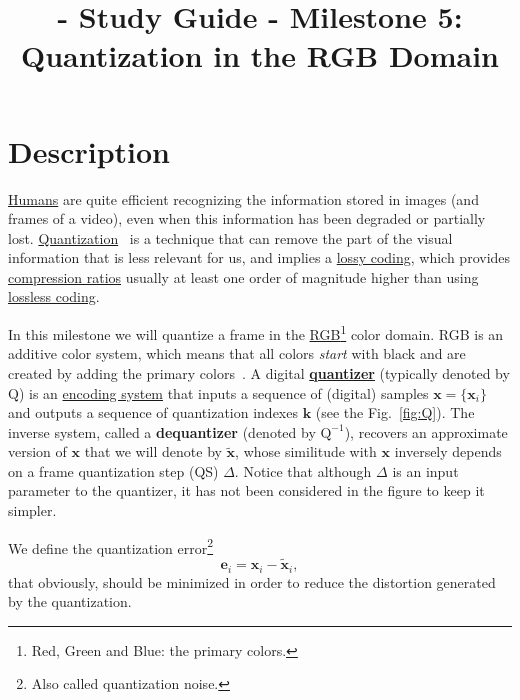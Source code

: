 
\title{\SM{} - Study Guide - Milestone 5: Quantization in the RGB Domain}

\maketitle

\tableofcontents

\section{Description}
\href{https://en.wikipedia.org/wiki/Visual_system}{Humans} are quite
efficient recognizing the information stored in images (and frames of
a video), even when this information has been degraded or partially
lost. \href{https://en.wikipedia.org/wiki/Quantization_(signal_processing)}{Quantization}~\cite{sayood2017introduction,vetterli2014foundations}
is a technique that can remove the part of the visual information that
is less relevant for us, and implies a
\href{https://en.wikipedia.org/wiki/Lossy_compression}{lossy coding},
which provides
\href{https://en.wikipedia.org/wiki/Data_compression_ratio}{compression
  ratios} usually at least one order of magnitude higher than using
\href{https://en.wikipedia.org/wiki/Lossless_compression}{lossless
  coding}.

In this milestone we will quantize a frame in the
\href{https://en.wikipedia.org/wiki/RGB_color_model}{RGB\footnote{Red,
    Green and Blue: the primary colors.} color domain}. RGB is an
additive color system, which means that all colors \emph{start} with
black and are created by adding the primary
colors~\cite{burger2016digital}. A digital
\href{https://en.wikipedia.org/wiki/Quantization_(signal_processing)}{\textbf{quantizer}}
(typically denoted by $\text{Q}$) is an
\href{https://en.wikipedia.org/wiki/Data_compression}{encoding system}
that inputs a sequence of (digital) samples
${\mathbf x}=\{{\mathbf x}_i\}$ and outputs a sequence of quantization
indexes ${\mathbf k}$ (see the Fig.~\ref{fig:Q}). The inverse system,
called a \textbf{dequantizer} (denoted by $\text{Q}^{-1}$), recovers
an approximate version of ${\mathbf x}$ that we will denote by
$\tilde{{\mathbf x}}$, whose similitude with ${\mathbf x}$ inversely
depends on a frame quantization step (QS) $\Delta$. Notice that
although $\Delta$ is an input parameter to the quantizer, it has not
been considered in the figure to keep it simpler.

We define the quantization error\footnote{Also called quantization
noise.}
\begin{equation}
  {\mathbf e}_i = {\mathbf x}_i - \tilde{{\mathbf x}}_i,
\end{equation}
that obviously, should be minimized in order to reduce the distortion
generated by the quantization.

